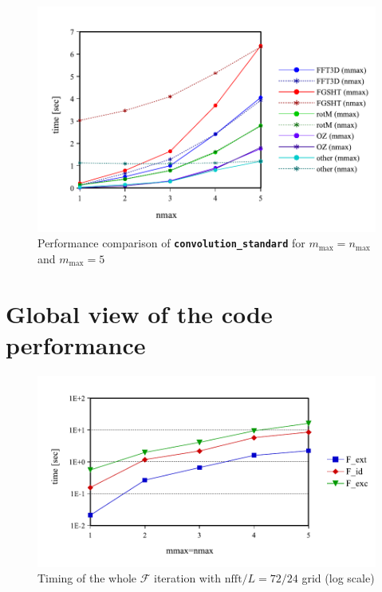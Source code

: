 \begin{figure}[H]
\begin{centering}
\includegraphics[bb=0bp 20bp 639bp 268bp,width=1\columnwidth]{_figure/results/nmax}
\par\end{centering}
\caption[Performance comparison of ``convolution\_standard'' for $m_{\max}=n_{\max}$
and $m_{\max}=5$]{Performance comparison of \texttt{\textbf{convolution\_standard}}
for $m_{\max}=n_{\max}$ and $m_{\max}=5$\label{fig:comparison-nmax}}
\end{figure}


\section{Global view of the code performance}

\begin{figure}[H]
\begin{centering}
\includegraphics[bb=0bp 20bp 453bp 236bp,scale=0.7]{_figure/results/global_perf}
\par\end{centering}
\caption[Timing of the whole $\mathcal{F}$ iteration]{Timing of the whole $\mathcal{F}$ iteration with $\mathrm{nfft}/L=72/24$
grid (log scale)}
\end{figure}

